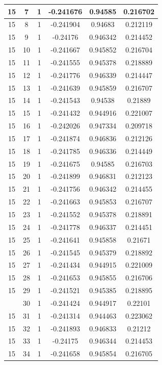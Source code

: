 \documentclass[12pt,a4paper]{article}
\numberwithin{equation}{section}
\numberwithin{figure}{section}
\numberwithin{table}{section}
\begin{document}
\begin{longtable}{|c|c|c|c|c|c|}
15 & 7 & 1 & -0.241676 & 0.94585 & 0.216702 \\ \hline
15 & 8 & 1 & -0.241904 & 0.94683 & 0.212119 \\ \hline
15 & 9 & 1 & -0.24176 & 0.946342 & 0.214452 \\ \hline
15 & 10 & 1 & -0.241667 & 0.945852 & 0.216704 \\ \hline
15 & 11 & 1 & -0.241555 & 0.945378 & 0.218889 \\ \hline
15 & 12 & 1 & -0.241776 & 0.946339 & 0.214447 \\ \hline
15 & 13 & 1 & -0.241639 & 0.945859 & 0.216707 \\ \hline
15 & 14 & 1 & -0.241543 & 0.94538 & 0.21889 \\ \hline
15 & 15 & 1 & -0.241432 & 0.944916 & 0.221007 \\ \hline
15 & 16 & 1 & -0.242026 & 0.947334 & 0.209718 \\ \hline
15 & 17 & 1 & -0.241874 & 0.946836 & 0.212126 \\ \hline
15 & 18 & 1 & -0.241785 & 0.946336 & 0.214449 \\ \hline
15 & 19 & 1 & -0.241675 & 0.94585 & 0.216703 \\ \hline
15 & 20 & 1 & -0.241899 & 0.946831 & 0.212123 \\ \hline
15 & 21 & 1 & -0.241756 & 0.946342 & 0.214455 \\ \hline
15 & 22 & 1 & -0.241663 & 0.945853 & 0.216707 \\ \hline
15 & 23 & 1 & -0.241552 & 0.945378 & 0.218891 \\ \hline
15 & 24 & 1 & -0.241778 & 0.946337 & 0.214451 \\ \hline
15 & 25 & 1 & -0.241641 & 0.945858 & 0.21671 \\ \hline
15 & 26 & 1 & -0.241545 & 0.945379 & 0.218892 \\ \hline
15 & 27 & 1 & -0.241434 & 0.944915 & 0.221009 \\ \hline
15 & 28 & 1 & -0.241653 & 0.945855 & 0.216706 \\ \hline
15 & 29 & 1 & -0.241521 & 0.945385 & 0.218895 \\ \hline
\pagebreak
15 & 30 & 1 & -0.241424 & 0.944917 & 0.22101 \\ \hline
15 & 31 & 1 & -0.241314 & 0.944463 & 0.223062 \\ \hline
15 & 32 & 1 & -0.241893 & 0.946833 & 0.21212 \\ \hline
15 & 33 & 1 & -0.24175 & 0.946344 & 0.214453 \\ \hline
15 & 34 & 1 & -0.241658 & 0.945854 & 0.216705 \\ \hline

\end{longtable}
\end{document}
